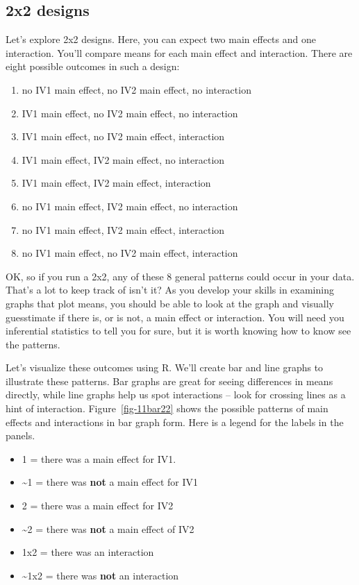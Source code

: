 \documentclass[
  letterpaper,
  DIV=11,
  numbers=noendperiod]{scrreprt}
\providecommand{\tightlist}{%
  \setlength{\itemsep}{0pt}\setlength{\parskip}{0pt}}
\begin{document}
\subsection{2x2 designs}\label{x2-designs-1}

Let's explore 2x2 designs. Here, you can expect two main effects and one
interaction. You'll compare means for each main effect and interaction.
There are eight possible outcomes in such a design:

\begin{enumerate}
\def\labelenumi{\arabic{enumi}.}
\tightlist
\item
  no IV1 main effect, no IV2 main effect, no interaction
\item
  IV1 main effect, no IV2 main effect, no interaction
\item
  IV1 main effect, no IV2 main effect, interaction
\item
  IV1 main effect, IV2 main effect, no interaction
\item
  IV1 main effect, IV2 main effect, interaction
\item
  no IV1 main effect, IV2 main effect, no interaction
\item
  no IV1 main effect, IV2 main effect, interaction
\item
  no IV1 main effect, no IV2 main effect, interaction
\end{enumerate}

OK, so if you run a 2x2, any of these 8 general patterns could occur in
your data. That's a lot to keep track of isn't it? As you develop your
skills in examining graphs that plot means, you should be able to look
at the graph and visually guesstimate if there is, or is not, a main
effect or interaction. You will need you inferential statistics to tell
you for sure, but it is worth knowing how to know see the patterns.

Let's visualize these outcomes using R. We'll create bar and line graphs
to illustrate these patterns. Bar graphs are great for seeing
differences in means directly, while line graphs help us spot
interactions -- look for crossing lines as a hint of interaction.
Figure~\ref{fig-11bar22} shows the possible patterns of main effects and
interactions in bar graph form. Here is a legend for the labels in the
panels.

\begin{itemize}
\tightlist
\item
  1 = there was a main effect for IV1.
\item
  \textasciitilde1 = there was \textbf{not} a main effect for IV1
\item
  2 = there was a main effect for IV2
\item
  \textasciitilde2 = there was \textbf{not} a main effect of IV2
\item
  1x2 = there was an interaction
\item
  \textasciitilde1x2 = there was \textbf{not} an interaction
\end{itemize}
\end{document}

